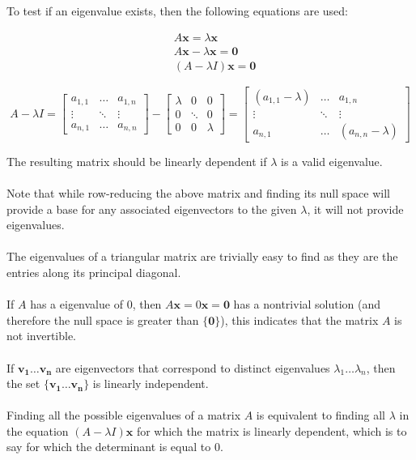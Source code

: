 \documentclass[12pt]{article}
\newcommand{\bm}[1]{\mathbf{{#1}}}
\newcommand{\mb}{\begin{bmatrix}}
\newcommand{\me}{\end{bmatrix}}
\newcommand{\set}[1]{\{{#1}\}}
\begin{document}
To test if an eigenvalue exists, then the following equations are used:

\begin{align*}
    & A\bm{x} = \lambda\bm{x} \\
    & A\bm{x} - \lambda\bm{x} = \bm{0} \\
    & (A - \lambda I)\bm{x} = \bm{0}
\end{align*}

$$ A - \lambda I =
\mb a_{1,1} & \dots & a_{1,n} \\
\vdots & \ddots & \vdots \\
a_{n,1} & \dots & a_{n,n} \me - \mb
\lambda & 0 & 0 \\
0 & \ddots & 0 \\
0 & 0 & \lambda \me =
\mb (a_{1,1} - \lambda) & \dots & a_{1,n} \\
\vdots & \ddots & \vdots \\
a_{n,1} & \dots & (a_{n,n} - \lambda) \me
$$

The resulting matrix should be linearly dependent if $\lambda$ is a
valid eigenvalue. \\ \\

Note that while row-reducing the above matrix and finding its null space
will provide a base for any associated eigenvectors to the given $\lambda$,
it will not provide eigenvalues. \\ \\

The eigenvalues of a triangular matrix are trivially easy to find as
they are the entries along its principal diagonal. \\ \\

If $A$ has a eigenvalue of $0$, then $A\bm{x} = 0\bm{x} = \bm{0}$ has a nontrivial
solution (and therefore the null space is greater than $\set{\bm{0}}$), this indicates that the matrix $A$ is not invertible. \\ \\

If $\bm{v_1 \dots v_n}$ are eigenvectors that correspond to distinct
eigenvalues $\lambda_1 \dots \lambda_n$, then the set $\set{\bm{v_1 \dots v_n}}$
is linearly independent. \\ \\

Finding all the possible eigenvalues of a matrix $A$ is equivalent to
finding all $\lambda$ in the equation $(A - \lambda I)\bm{x}$ for which
the matrix is linearly dependent, which is to say for which the determinant is equal to $0$. \\ \\
\end{document}
